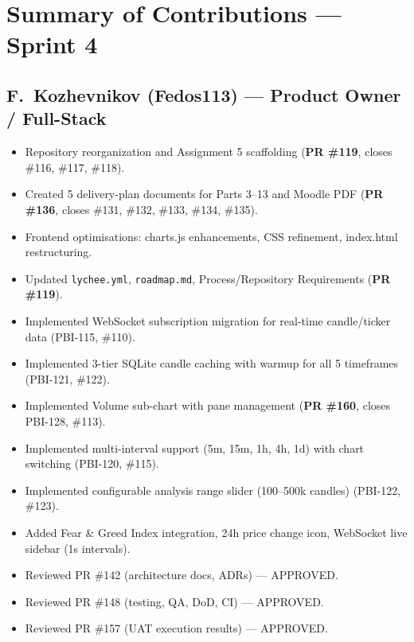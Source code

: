 \documentclass[11pt,a4paper]{article}
\begin{document}
\section{Summary of Contributions --- Sprint 4}

\subsection{F.~Kozhevnikov (Fedos113) --- Product Owner / Full-Stack}
\begin{itemize}[leftmargin=*]
    \item Repository reorganization and Assignment 5 scaffolding (\textbf{PR \#119}, closes \#116, \#117, \#118).
    \item Created 5 delivery-plan documents for Parts 3--13 and Moodle PDF (\textbf{PR \#136}, closes \#131, \#132, \#133, \#134, \#135).
    \item Frontend optimisations: charts.js enhancements, CSS refinement, index.html restructuring.
    \item Updated \texttt{lychee.yml}, \texttt{roadmap.md}, Process/Repository Requirements (\textbf{PR \#119}).
    \item Implemented WebSocket subscription migration for real-time candle/ticker data (PBI-115, \#110).
    \item Implemented 3-tier SQLite candle caching with warmup for all 5 timeframes (PBI-121, \#122).
    \item Implemented Volume sub-chart with pane management (\textbf{PR \#160}, closes PBI-128, \#113).
    \item Implemented multi-interval support (5m, 15m, 1h, 4h, 1d) with chart switching (PBI-120, \#115).
    \item Implemented configurable analysis range slider (100--500k candles) (PBI-122, \#123).
    \item Added Fear \& Greed Index integration, 24h price change icon, WebSocket live sidebar (1s intervals).
    \item Reviewed PR \#142 (architecture docs, ADRs) --- APPROVED.
    \item Reviewed PR \#148 (testing, QA, DoD, CI) --- APPROVED.
    \item Reviewed PR \#157 (UAT execution results) --- APPROVED.
\end{itemize}
\end{document}
